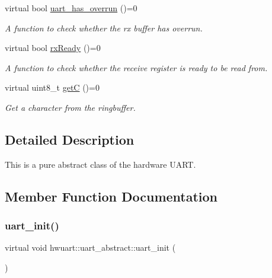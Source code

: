 \begin{DoxyCompactItemize}
\mbox{\label{classhwuart_1_1uart__abstract_a46106dfe7b7a87ad8541f15db8ca02f1}} 
virtual bool \hyperlink{classhwuart_1_1uart__abstract_a46106dfe7b7a87ad8541f15db8ca02f1}{uart\+\_\+has\+\_\+overrun} ()=0
\begin{DoxyCompactList}\small\item\em A function to check whether the rx buffer has overrun. \end{DoxyCompactList}\item 
\mbox{\label{classhwuart_1_1uart__abstract_aa9231492ae6330dad3a6ccea75655397}} 
virtual bool \hyperlink{classhwuart_1_1uart__abstract_aa9231492ae6330dad3a6ccea75655397}{rx\+Ready} ()=0
\begin{DoxyCompactList}\small\item\em A function to check whether the receive register is ready to be read from. \end{DoxyCompactList}\item 
\mbox{\label{classhwuart_1_1uart__abstract_a642fddc745672c2404b848f33d415b82}} 
virtual uint8\+\_\+t \hyperlink{classhwuart_1_1uart__abstract_a642fddc745672c2404b848f33d415b82}{getC} ()=0
\begin{DoxyCompactList}\small\item\em Get a character from the ringbuffer. \end{DoxyCompactList}\end{DoxyCompactItemize}


\subsection{Detailed Description}
This is a pure abstract class of the hardware U\+A\+RT. 

\subsection{Member Function Documentation}
\mbox{\label{classhwuart_1_1uart__abstract_aa9042efec08b2f9714b35b1bc864cc7b}} 
\subsubsection{\texorpdfstring{uart\+\_\+init()}{uart\_init()}}
{\footnotesize\ttfamily virtual void hwuart\+::uart\+\_\+abstract\+::uart\+\_\+init (\begin{DoxyParamCaption}{ }\end{DoxyParamCaption})\hspace{0.3cm}{\ttfamily [pure virtual]}}



